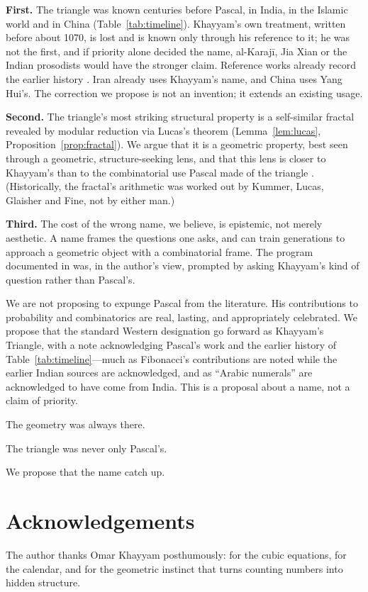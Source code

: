 \documentclass[11pt]{amsart}
\begin{document}
\textbf{First.} The triangle was known centuries before Pascal, in India, in the Islamic world and in China (Table~\ref{tab:timeline}). Khayyam's own treatment, written before about 1070, is lost and is known only through his reference to it; he was not the first, and if priority alone decided the name, al-Karajī, Jia Xian or the Indian prosodists would have the stronger claim. Reference works already record the earlier history \cite{mathworld,edwards1987}. Iran already uses Khayyam's name, and China uses Yang Hui's. The correction we propose is not an invention; it extends an existing usage.

\textbf{Second.} The triangle's most striking structural property is a self-similar fractal revealed by modular reduction via Lucas's theorem (Lemma~\ref{lem:lucas}, Proposition~\ref{prop:fractal}). We argue that it is a geometric property, best seen through a geometric, structure-seeking lens, and that this lens is closer to Khayyam's \cite{khayyam1070} than to the combinatorial use Pascal made of the triangle \cite{pascal1654}. (Historically, the fractal's arithmetic was worked out by Kummer, Lucas, Glaisher and Fine, not by either man.)

\textbf{Third.} The cost of the wrong name, we believe, is epistemic, not merely aesthetic. A name frames the questions one asks, and can train generations to approach a geometric object with a combinatorial frame. The program documented in \cite{forcing,ramanujan,eisenstein,w3condition,shannon,spherical} was, in the author's view, prompted by asking Khayyam's kind of question rather than Pascal's.

We are not proposing to expunge Pascal from the literature. His contributions to probability and combinatorics are real, lasting, and appropriately celebrated. We propose that the standard Western designation go forward as Khayyam's Triangle, with a note acknowledging Pascal's work and the earlier history of Table~\ref{tab:timeline}---much as Fibonacci's contributions are noted while the earlier Indian sources are acknowledged, and as ``Arabic numerals'' are acknowledged to have come from India. This is a proposal about a name, not a claim of priority.

The geometry was always there.

The triangle was never only Pascal's.

We propose that the name catch up.

\section*{Acknowledgements}
The author thanks Omar Khayyam posthumously: for the cubic equations, for the calendar, and for the geometric instinct that turns counting numbers into hidden structure.
\end{document}

